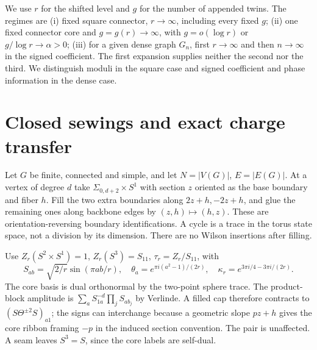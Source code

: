 \documentclass[11pt]{article}
\theoremstyle{definition}
\begin{document}
We use \(r\) for the shifted level and \(g\) for the number of appended twins. The regimes are (i) fixed square connector, \(r\to\infty\), including every fixed \(g\); (ii) one fixed connector core and \(g=g(r)\to\infty\), with \(g=o(\log r)\) or \(g/\log r\to\alpha>0\); (iii) for a given dense graph \(G_n\), first \(r\to\infty\) and then \(n\to\infty\) in the signed coefficient. The first expansion supplies neither the second nor the third. We distinguish moduli in the square case and signed coefficient and phase information in the dense case.

\section{Closed sewings and exact charge transfer}\label{sec:sewing}
Let \(G\) be finite, connected and simple, and let \(N=|V(G)|\), \(E=|E(G)|\). At a vertex of degree \(d\) take \(\Sigma_{0,d+2}\times S^1\) with section \(z\) oriented as the base boundary and fiber \(h\). Fill the two extra boundaries along \(2z+h,-2z+h\), and glue the remaining ones along backbone edges by \((z,h)\mapsto(h,z)\). These are orientation-reversing boundary identifications. A cycle is a trace in the torus state space, not a division by its dimension. There are no Wilson insertions after filling.

Use \(Z_r(S^2\times S^1)=1\), \(Z_r(S^3)=S_{11}\), \(\tau_r=Z_r/S_{11}\), with
\[
 S_{ab}=\sqrt{2/r}\sin(\pi ab/r),\quad
 \theta_a=e^{\pi i(a^2-1)/(2r)},\quad
 \kappa_r=e^{3\pi i/4-3\pi i/(2r)}.
\]
The core basis is dual orthonormal by the two-point sphere trace. The product-block amplitude is \(\sum_a S_{1a}^{-d}\prod_j S_{ab_j}\) by Verlinde. A filled cap therefore contracts to \((S\Theta^{\pm2}S)_{a1}\); the signs can interchange because a geometric slope \(pz+h\) gives the core ribbon framing \(-p\) in the induced section convention. The pair is unaffected. A seam leaves \(S^3=S\), since the core labels are self-dual.
\end{document}
